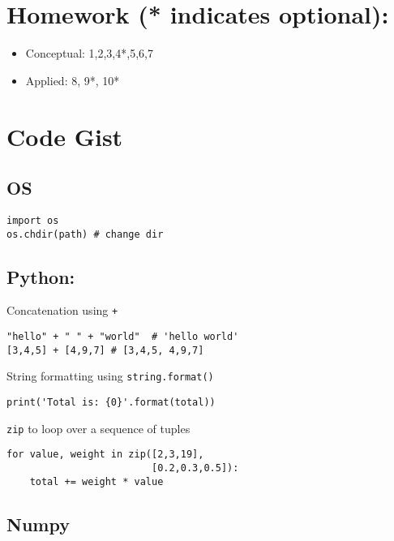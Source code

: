 \documentclass[
  letterpaper,
  DIV=11,
  numbers=noendperiod]{scrreprt}
\providecommand{\tightlist}{%
  \setlength{\itemsep}{0pt}\setlength{\parskip}{0pt}}\usepackage{longtable,booktabs,array}
\begin{document}
\section{Homework (* indicates
optional):}\label{homework-indicates-optional}

\begin{itemize}
\tightlist
\item
  Conceptual: 1,2,3,4*,5,6,7
\item
  Applied: 8, 9*, 10*
\end{itemize}

\section{Code Gist}\label{code-gist}

\subsection{OS}\label{os}

\begin{verbatim}
import os
os.chdir(path) # change dir
\end{verbatim}

\subsection{Python:}\label{python}

Concatenation using \texttt{+}

\begin{verbatim}
"hello" + " " + "world"  # 'hello world'
[3,4,5] + [4,9,7] # [3,4,5, 4,9,7]
\end{verbatim}

String formatting using \texttt{string.format()}

\begin{verbatim}
print('Total is: {0}'.format(total))
\end{verbatim}

\texttt{zip} to loop over a sequence of tuples

\begin{verbatim}
for value, weight in zip([2,3,19],
                         [0.2,0.3,0.5]):
    total += weight * value
\end{verbatim}

\subsection{Numpy}\label{numpy}
\end{document}
